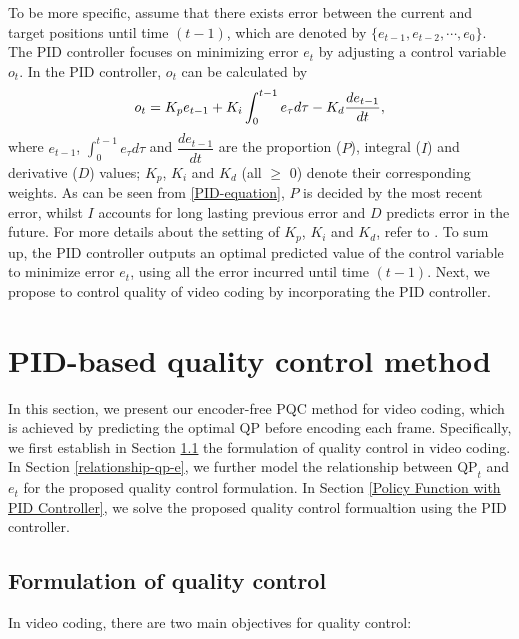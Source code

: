 \documentclass[smallabstract,smallcaptions]{dccpaper}
\begin{document}
To be more specific, assume that there exists error between the current and target positions until time $(t-1)$, which are denoted by $\lbrace e_{t-1},e_{t-2},\cdots,e_{0} \rbrace$. The PID controller focuses on minimizing error $e_t$ by adjusting a control variable $o_t$. In the PID controller, $o_t$ can be calculated by
\vspace{-0.7em}
\begin{equation}
\label{PID-equation}
o_t=K_pe_{t-1}+K_i\int^{t-1}_0e_{\tau}d{\tau}-K_d\dfrac{de_{t-1}}{dt},
\vspace{-0.7em}
\end{equation}
where $e_{t-1}$, $\int^{t-1}_0e_{\tau}d{\tau}$ and $\dfrac{de_{t-1}}{dt}$ are the proportion ($P$), integral ($I$) and derivative ($D$) values; $K_p$, $K_i$ and $K_d$ (all $\geq$ 0) denote their corresponding weights. As can be seen from \eqref{PID-equation}, $P$ is decided by the most recent error, whilst $I$ accounts for long lasting previous error and $D$ predicts error in the future. For more details about the setting of $K_p$, $K_i$ and $K_d$, refer to \cite{cominos2002pid}. To sum up, the PID controller outputs an optimal predicted value of the control variable to minimize error $e_t$, using all the error incurred until time $(t-1)$. Next, we propose to control quality of video coding by incorporating the PID controller.
\vspace{-1.0em}
\section{PID-based quality control method}\label{PID-based-quality-control-method}
\vspace{-1.0em}
In this section, we present our encoder-free PQC method for video coding, which is achieved by predicting the optimal $\mathrm{QP}$ before encoding each frame. Specifically, we first establish in Section \ref{Framework of PID-based-quality-control-method} the formulation  of quality control in video coding. In Section \ref{relationship-qp-e}, we further model the relationship between $\mathrm{QP}_{t}$ and $e_t$ for the proposed quality control formulation. In Section \ref{Policy Function with PID Controller}, we solve the proposed quality control formualtion using the PID controller.
\vspace{-1.0em}
\subsection{Formulation of quality control}\label{Framework of PID-based-quality-control-method}
\vspace{-0.5em}
In video coding, there are two main objectives for quality control:
\end{document}
